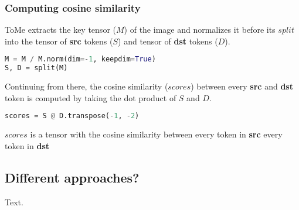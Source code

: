\subsubsection*{Computing cosine similarity}
ToMe extracts the key tensor (\(M\)) of the image and normalizes it before its \(split\) into the tensor of \textbf{src} tokens (\(S\)) and tensor of \textbf{dst} tokens (\(D\)).
\begin{lstlisting}[language=Python]
M = M / M.norm(dim=-1, keepdim=True)
S, D = split(M)
\end{lstlisting}
Continuing from there, the cosine similarity (\(scores\)) between every \textbf{src} and \textbf{dst} token is computed by taking the dot product of \(S\) and \(D\).
\begin{lstlisting}[language=Python]
scores = S @ D.transpose(-1, -2)
\end{lstlisting}
\(scores\) is a tensor with the cosine similarity between every token in \textbf{src} every token in \textbf{dst} 

\subsection{Different approaches?}
Text.

